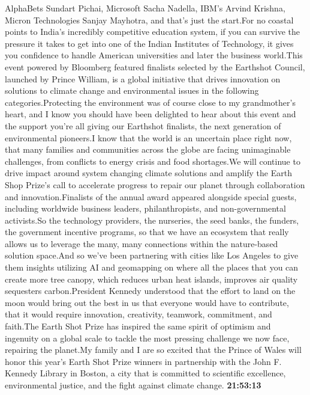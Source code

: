 \documentclass{article}%
\begin{document}
AlphaBets Sundart Pichai, Microsoft Sacha Nadella, IBM's Arvind Krishna, Micron Technologies Sanjay Mayhotra, and that's just the start.For no coastal points to India's incredibly competitive education system, if you can survive the pressure it takes to get into one of the Indian Institutes of Technology, it gives you confidence to handle American universities and later the business world.This event powered by Bloomberg featured finalists selected by the Earthshot Council, launched by Prince William, is a global initiative that drives innovation on solutions to climate change and environmental issues in the following categories.Protecting the environment was of course close to my grandmother's heart, and I know you should have been delighted to hear about this event and the support you're all giving our Earthshot finalists, the next generation of environmental pioneers.I know that the world is an uncertain place right now, that many families and communities across the globe are facing unimaginable challenges, from conflicts to energy crisis and food shortages.We will continue to drive impact around system changing climate solutions and amplify the Earth Shop Prize's call to accelerate progress to repair our planet through collaboration and innovation.Finalists of the annual award appeared alongside special guests, including worldwide business leaders, philanthropists, and non{-}governmental activists.So the technology providers, the nurseries, the seed banks, the funders, the government incentive programs, so that we have an ecosystem that really allows us to leverage the many, many connections within the nature{-}based solution space.And so we've been partnering with cities like Los Angeles to give them insights utilizing AI and geomapping on where all the places that you can create more tree canopy, which reduces urban heat islands, improves air quality sequesters carbon.President Kennedy understood that the effort to land on the moon would bring out the best in us that everyone would have to contribute, that it would require innovation, creativity, teamwork, commitment, and faith.The Earth Shot Prize has inspired the same spirit of optimism and ingenuity on a global scale to tackle the most pressing challenge we now face, repairing the planet.My family and I are so excited that the Prince of Wales will honor this year's Earth Shot Prize winners in partnership with the John F. Kennedy Library in Boston, a city that is committed to scientific excellence, environmental justice, and the fight against climate change.%
\textbf{21:53:13}%
\newline%
\end{document}

